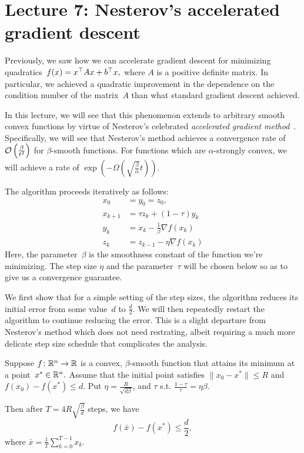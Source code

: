 \section{Lecture 7: Nesterov’s accelerated gradient descent}

Previously, we saw how we can accelerate gradient descent for minimizing
quadratics~$f(x)=x^\top A x+b^\top x,$ where $A$ is a positive definite
matrix. In particular, we achieved a quadratic improvement in the dependence
on the condition number of the matrix~$A$ than what standard gradient descent
achieved.

In this lecture, we will see that this phenomenon extends to arbitrary smooth
convex functions by virtue of Nesterov's celebrated \emph{accelerated gradient
method}~\cite{Nesterov83, Nesterov04}. Specifically, we will see that Nesterov's
method achieves a convergence rate of~${\cal O} \left(\frac{\beta}{t^2}\right)$ for
$\beta$-smooth functions. For functions which are $\alpha$-strongly convex, we
will achieve a rate of $\exp\left( -\Omega\left(\sqrt{\frac{\beta}{\alpha}}
t\right)\right)$. 

The algorithm proceeds iteratively as follows: 
\begin{align*}
x_0 &= y_0 = z_0, \\
x_{k+1} &= \tau z_k + (1 - \tau) y_k \tag{$k\ge 0$}\\
y_k &= x_k - \frac{1}{\beta} \nabla f(x_k) \tag{$k\ge 1$}\\
z_k &= z_{k -1} - \eta\nabla f(x_k)\tag{$k\ge 1$}
\end{align*}
Here, the parameter~$\beta$ is the smoothness constant of the function we're
minimizing. The step size $\eta$ and the parameter~$\tau$ will be chosen below
so as to give us a convergence guarantee.

We first show that for a simple setting of the step sizes, the algorithm reduces
its initial error from some value~$d$ to $\frac{d}{2}.$ We will then repeatedly
restart the algorithm to continue reducing the error. This is a slight departure
from Nesterov's method which does not need restrating, albeit requiring a much
more delicate step size schedule that complicates the analysis.


\begin{lemma}
Suppose $f\colon\mathbb{R}^n\to\mathbb{R}$ is a convex, $\beta$-smooth function that attains its
minimum at a point~$x^*\in\mathbb{R}^n.$
Assume that the initial point satisfies $\|x_0-x^*\|\le R$ and $f(x_0)-f(x^*)\le
d.$ Put $\eta = \frac{R}{\sqrt{d\beta}}$, and 
$\tau$ s.t. $\frac{1-\tau}{\tau} = \eta \beta$.

Then after $T = 4R\sqrt{\frac{\beta}{d}}$ steps, 
we have 
\[
f(\bar{x})- f(x^*) \leq \frac{d}{2},
\]
where $\bar{x} = \frac{1}{T} \sum_{k=0}^{T-1} x_k$.
\end{lemma}

